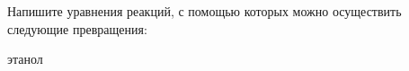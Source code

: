 Напишите уравнения реакций, с помощью которых можно осуществить следующие превращения:


этанол             \\